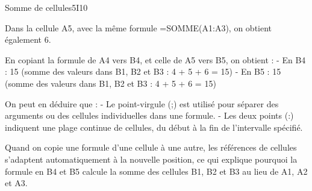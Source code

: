\begin{EXO}{Somme de cellules}{5I10}
\begin{tcbenumerate}[1]
    \tcbitem Dans la cellule A5, avec la même formule =SOMME(A1:A3), on obtient également 6.
    
    \tcbitem En copiant la formule de A4 vers B4, et celle de A5 vers B5, on obtient :
    - En B4 : 15 (somme des valeurs dans B1, B2 et B3 : 4 + 5 + 6 = 15)
    - En B5 : 15 (somme des valeurs dans B1, B2 et B3 : 4 + 5 + 6 = 15)
    
    \tcbitem On peut en déduire que :
    - Le point-virgule (;) est utilisé pour séparer des arguments ou des cellules individuelles dans une formule.
    - Les deux points (:) indiquent une plage continue de cellules, du début à la fin de l'intervalle spécifié.
    
    Quand on copie une formule d'une cellule à une autre, les références de cellules s'adaptent automatiquement à la nouvelle position, ce qui explique pourquoi la formule en B4 et B5 calcule la somme des cellules B1, B2 et B3 au lieu de A1, A2 et A3.
\end{tcbenumerate}

\end{EXO}

